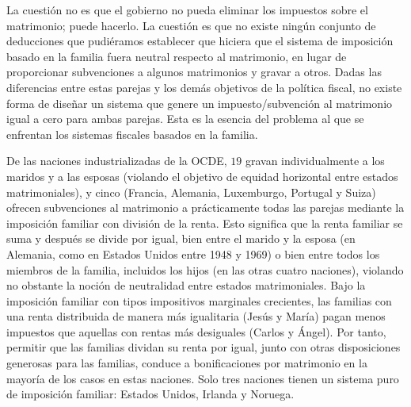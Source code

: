\documentclass[10pt,a4paper]{article}
\begin{document}
La cuestión no es que el gobierno no pueda eliminar los impuestos sobre el matrimonio; puede hacerlo. La cuestión es que no existe ningún conjunto de deducciones que pudiéramos establecer que hiciera que el sistema de imposición basado en la familia fuera neutral respecto al matrimonio, en lugar de proporcionar subvenciones a algunos matrimonios y gravar a otros. Dadas las diferencias entre estas parejas y los demás objetivos de la política fiscal, no existe forma de diseñar un sistema que genere un impuesto/subvención al matrimonio igual a cero para ambas parejas. Esta es la esencia del problema al que se enfrentan los sistemas fiscales basados en la familia.

De las naciones industrializadas de la OCDE, $19$ gravan individualmente a los maridos y a las esposas (violando el objetivo de equidad horizontal entre estados matrimoniales), y cinco (Francia, Alemania, Luxemburgo, Portugal y Suiza) ofrecen subvenciones al matrimonio a prácticamente todas las parejas mediante la imposición familiar con división de la renta. Esto significa que la renta familiar se suma y después se divide por igual, bien entre el marido y la esposa (en Alemania, como en Estados Unidos entre 1948 y 1969) o bien entre todos los miembros de la familia, incluidos los hijos (en las otras cuatro naciones), violando no obstante la noción de neutralidad entre estados matrimoniales. Bajo la imposición familiar con tipos impositivos marginales crecientes, las familias con una renta distribuida de manera más igualitaria (Jesús y María) pagan menos impuestos que aquellas con rentas más desiguales (Carlos y Ángel). Por tanto, permitir que las familias dividan su renta por igual, junto con otras disposiciones generosas para las familias, conduce a bonificaciones por matrimonio en la mayoría de los casos en estas naciones. Solo tres naciones tienen un sistema puro de imposición familiar: Estados Unidos, Irlanda y Noruega.
\end{document}
